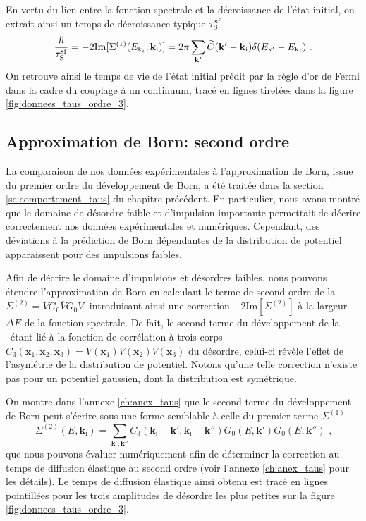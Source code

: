 En vertu du lien entre la fonction spectrale et la décroissance de l'état initial, on extrait ainsi un temps de décroissance typique $\tau_{\mathrm{S}}^{\mathrm{sf}}$ 
\begin{equation}
\frac{\hslash}{\tau_{\mathrm{S}}^{\mathrm{sf}}}=-2 \mathrm{Im}[\Sigma^{(1)}(E_{\mathrm{k}_i},\mathbf{k}_{\mathrm{i}})]=2\pi \sum_{\mathbf{k}'}{\widetilde{C}(\mathbf{k}'-\mathbf{k}_{\mathrm{i}}) \delta(E_{\mathrm{k}'}-E_{\mathrm{k}_i})} \text{ .}
\end{equation}
On retrouve ainsi le temps de vie de l'état initial prédit par la règle d'or de Fermi dans la cadre du couplage à un continuum, tracé en lignes tiretées dans la figure \ref{fig:donnees_taus_ordre_3}. 



\subsection{Approximation de Born: second ordre}
La comparaison de nos données expérimentales à l'approximation de Born, issue du premier ordre du développement de Born, a été traitée dans la section \ref{sc:comportement_taus} du chapitre précédent. En particulier, nous avons montré que le domaine de désordre faible et d'impulsion importante permettait de décrire correctement nos données expérimentales et numériques. Cependant, des déviations à la prédiction de Born dépendantes de la distribution de potentiel apparaissent pour des impulsions faibles. 

Afin de décrire le domaine d'impulsions et désordres faibles, nous pouvons étendre l'approximation de Born en calculant le terme de second ordre de la \selfenergy\ $\Sigma^{(2)}= \overline{V G_0 V G_0 V}$, introduisant ainsi une correction $-2 \mathrm{Im}[\Sigma^{(2)}]$ à la largeur $\Delta E$ de la fonction spectrale. De fait, le second terme du développement de la \selfenergy\ étant lié à la fonction de corrélation à trois corps $C_{\mathrm{3}}(\mathbf{x}_{\mathrm{1}}, \mathbf{x}_{\mathrm{2}}, \mathbf{x}_{\mathrm{3}})=\overline{V(\mathbf{x}_{\mathrm{1}}) V(\mathbf{x}_{\mathrm{2}}) V(\mathbf{x}_{\mathrm{3}})}$ du désordre, celui-ci révèle l'effet de l'asymétrie de la distribution de potentiel. Notons qu'une telle correction n'existe pas pour un potentiel gaussien, dont la distribution est symétrique. 


On montre dans l'annexe \ref{ch:anex_taus} que le second terme du développement de Born peut s'écrire sous une forme semblable à celle du premier terme $\Sigma^{(1)}$
\begin{equation}
\Sigma^{(2)}(E,\mathbf{k}_{\mathrm{i}})=\sum_{\mathbf{k}',\mathbf{k}''}{\widetilde{C}_{\mathrm{3}}(\mathbf{k}_{\mathrm{i}}-\mathbf{k}',\mathbf{k}_{\mathrm{i}}-\mathbf{k}'') G_0(E,\mathbf{k}') G_0(E,\mathbf{k}'')} \text{ ,}
\end{equation}
que nous pouvons évaluer numériquement afin de déterminer la correction au temps de diffusion élastique au second ordre (voir l'annexe \ref{ch:anex_taus} pour les détails). Le temps de diffusion élastique ainsi obtenu est tracé en lignes pointillées pour les trois amplitudes de désordre les plus petites sur la figure \ref{fig:donnees_taus_ordre_3}.

